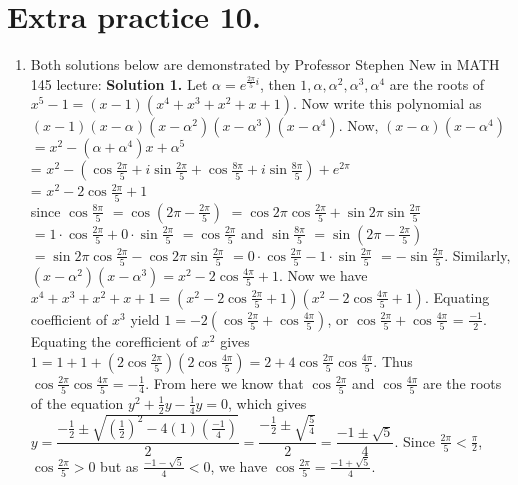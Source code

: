 \documentclass[11pt]{article}
\begin{document}
\section{Extra practice 10.}
\begin{enumerate}
\item Both solutions below are demonstrated by Professor Stephen New in MATH 145 lecture:
\textbf {Solution 1.} Let $\alpha=e^{\frac{2\pi}{5}i}$, then $1, \alpha, \alpha^2, \alpha^3, \alpha^4$ are the roots of $x^5-1=(x-1)(x^4+x^3+x^2+x+1)$. Now write this polynomial as $(x-1)(x-\alpha)(x-\alpha^2)(x-\alpha^3)(x-\alpha^4)$. 
Now, $(x-\alpha)(x-\alpha^4)$\\
$=x^2-(\alpha+\alpha^4)x+\alpha^5$\\
= $x^2-(\cos \frac{2\pi}{5}+i\sin\frac{2\pi}{5}+\cos\frac{8\pi}{5}+i\sin\frac{8\pi}{5})+e^{2\pi}$\\
= $x^2-2\cos\frac{2\pi}{5}+1$ \\
since
$\cos \frac{8\pi}{5}$
$=\cos(2\pi-\frac{2\pi}{5})$
$=\cos 2\pi \cos\frac{2\pi}{5}+\sin 2\pi \sin\frac{2\pi}{5}$
$=1\cdot \cos \frac{2\pi}{5}+0\cdot \sin \frac{2\pi}{5}$
$=\cos \frac{2\pi}{5}$
and
$\sin \frac{8\pi}{5}$
$=\sin(2\pi-\frac{2\pi}{5})$
$=\sin 2\pi \cos\frac{2\pi}{5}-\cos 2\pi \sin\frac{2\pi}{5}$
$=0\cdot \cos \frac{2\pi}{5}-1\cdot \sin \frac{2\pi}{5}$
$=-\sin \frac{2\pi}{5}$.
 Similarly, $(x-\alpha^2)(x-\alpha^3)=x^2-2\cos\frac{4\pi}{5}+1$. Now we have $x^4+x^3+x^2+x+1=(x^2-2\cos\frac{2\pi}{5}+1)(x^2-2\cos\frac{4\pi}{5}+1)$. Equating coefficient of $x^3$ yield $1=-2(\cos\frac{2\pi}{5}+\cos\frac{4\pi}{5})$, or $\cos\frac{2\pi}{5}+\cos\frac{4\pi}{5}$ = $\frac{-1}{2}$. Equating the corefficient of $x^2$ gives $1=1+1+(2\cos\frac{2\pi}{5})(2\cos\frac{4\pi}{5})=2+4\cos\frac{2\pi}{5}\cos\frac{4\pi}{5}$. Thus $\cos\frac{2\pi}{5}\cos\frac{4\pi}{5}=-\frac{1}{4}$. From here we know that $\cos\frac{2\pi}{5}$ and $\cos\frac{4\pi}{5}$ are the roots of the equation $y^2+\frac{1}{2}y-\frac{1}{4}y=0$, which gives $y=\dfrac{-\frac{1}{2}\pm\sqrt{(\frac{1}{2})^2-4(1)(\frac{-1}{4})}}{2}=\dfrac{-\frac{1}{2}\pm\sqrt{\frac{5}{4}}}{2}=\dfrac{-1\pm\sqrt{5}}{4}.$ Since $\frac{2\pi}{5}<\frac{\pi}{2}$, $\cos\frac{2\pi}{5}>0$ but as $\frac{-1-\sqrt{5}}{4}<0$, we have $\cos\frac{2\pi}{5}=\frac{-1+\sqrt{5}}{4}.$


\end{enumerate}
\end{document}
